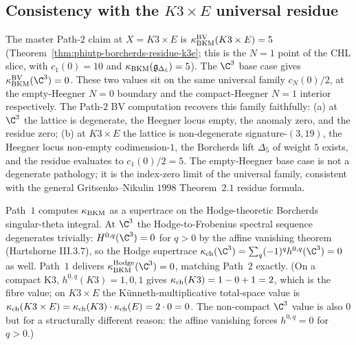\subsection*{Consistency with the $K3\times E$ universal residue}

\begin{remark}
\label{rem:bl-bv-c3-master-consistency}
The master Path-$2$ claim at $X = K3\times E$ is
$\kappa_{\mathrm{BKM}}^{\mathrm{BV}}(K3\times E) = 5$
(Theorem~\ref{thm:phiutp-borcherds-residue-k3e}; this is the
$N = 1$ point of the CHL slice, with $c_1(0) = 10$ and
$\kappa_{\mathrm{BKM}}(\mathfrak{g}_{\Delta_5}) = 5$). The $\C^3$ base case gives
$\kBKM^{\mathrm{BV}}(\C^3) = 0$. These two values sit on the
same universal family $c_N(0)/2$, at the empty-Heegner $N = 0$
boundary and the compact-Heegner $N = 1$ interior respectively.
The Path-$2$ BV computation recovers this family faithfully:
(a) at $\C^3$ the lattice is degenerate, the Heegner locus empty,
the anomaly zero, and the residue zero; (b) at $K3\times E$ the
lattice is non-degenerate signature-$(3,19)$, the Heegner locus
non-empty codimension-$1$, the Borcherds lift $\Delta_5$ of weight
$5$ exists, and the residue evaluates to $c_1(0)/2 = 5$. The
empty-Heegner base case is not a degenerate pathology; it is the
index-zero limit of the universal family, consistent with the
general Gritsenko--Nikulin $1998$ Theorem~$2.1$ residue formula.
\end{remark}

\begin{remark}
\label{rem:bl-bv-c3-path1-consistency}
Path~$1$ computes $\kappa_{\mathrm{BKM}}$ as a supertrace on the Hodge-theoretic
Borcherds singular-theta integral. At $\C^3$ the Hodge-to-Frobenius
spectral sequence degenerates trivially: $H^{0,q}(\C^3) = 0$ for
$q > 0$ by the affine vanishing theorem (Hartshorne III.$3$.$7$), so
the Hodge supertrace $\kch(\C^3) = \sum_q (-1)^q h^{0,q}(\C^3) = 0$
as well. Path~$1$ delivers $\kBKM^{\mathrm{Hodge}}(\C^3) = 0$,
matching Path~$2$ exactly.
(On a compact K3, $h^{0,q}(K3) = 1, 0, 1$ gives
$\kappa_{\mathrm{ch}}(K3) = 1 - 0 + 1 = 2$, which is the fibre value; on
$K3\times E$ the Künneth-multiplicative total-space value is
$\kappa_{\mathrm{ch}}(K3\times E) = \kappa_{\mathrm{ch}}(K3)\cdot \kappa_{\mathrm{ch}}(E) = 2\cdot 0 = 0$. The
non-compact $\C^3$ value is also $0$ but for a structurally
different reason: the affine vanishing forces
$h^{0,q} = 0$ for $q > 0$.)
\end{remark}

